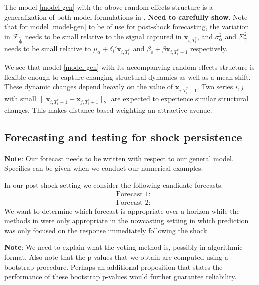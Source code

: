 \documentclass[11pt]{article}
\newcommand{\x}{\textbf{x}}
\def\mbf#1{\mathbf{#1}} %
\def\t#1{\tilde{#1}} %
\theoremstyle{definition}
\begin{document}
The model \eqref{model-gen} with the above random effects structure is a generalization of both model formulations in \cite{lin2021minimizing}. \textbf{Need to carefully show}. Note that for model \eqref{model-gen} to be of use for post-shock forecasting, the variation in $\mathcal{F}_{\tilde{\mathbf{\phi}}}$ needs to be small relative to the signal captured in $\x_{i,T_i^*}$, and $\sigma^2_\alpha$ and $\Sigma^2_\gamma$ needs to be small relative to $\mu_\alpha + \delta_i'\x_{i,T_i^*}$ and $\beta_o + \beta\mbf{x}_{i,T_i^*+1}$ respectively. 

We see that model \eqref{model-gen} with its accompanying random effects structure is flexible enough to capture changing structural dynamics as well as a mean-shift. These dynamic changes depend heavily on the value of $\mbf{x}_{i,T_i^*+1}$. Two series $i,j$ with small $\|\mbf{x}_{i,T_i^*+1} - \mbf{x}_{j,T_i^*+1}\|_2$ are expected to experience similar structural changes. This makes distance based weighting an attractive avenue.








\subsection{Forecasting and testing for shock persistence}
\label{forecast}

\noindent\textbf{Note}: Our forecast needs to be written with respect to our general model. Specifics can be given when we conduct our numerical examples.
\vspace*{0.5cm}

In our post-shock setting we consider the following candidate forecasts: 
\begin{align*}
  &\text{Forecast 1}: \\
  &\text{Forecast 2}: 
\end{align*}
We want to determine which forecast is appropriate over a horizon while the methods in \cite{lin2021minimizing} were only appropriate in the nowcasting setting in which prediction was only focused on the response immediately following the shock.


\vspace*{0.5cm}\noindent\textbf{Note}: We need to explain what the voting method is, possibly in algorithmic format. Also note that the p-values that we obtain are computed using a bootstrap procedure. Perhaps an additional proposition that states the performance of these bootstrap p-values would further guarantee reliability. 
\end{document}
